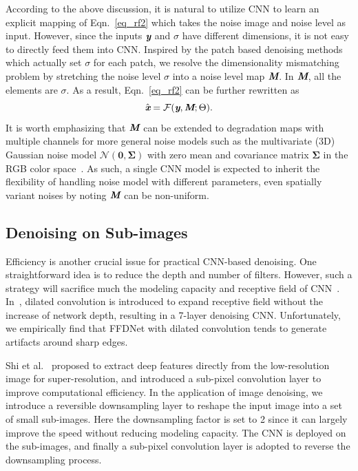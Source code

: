 \documentclass[journal]{IEEEtran}
\begin{document}
According to the above discussion, it is natural to utilize CNN to learn an explicit mapping of Eqn.~\eqref{eq_rf2} which takes the noise image and noise level as input.
However, since the inputs $\emph{\textbf{y}}$ and $\sigma$ have different dimensions, it is not easy to directly feed them into CNN.
Inspired by the patch based denoising methods which actually set $\sigma$ for each patch, we resolve the dimensionality mismatching problem by stretching the noise level $\sigma$ into a noise level map $\emph{\textbf{M}}$.
In $\emph{\textbf{M}}$, all the elements are $\sigma$. As a result, Eqn.~\eqref{eq_rf2} can be further rewritten as
\begin{equation}\label{eq_rf3}
\hat{\emph{\textbf{x}}} = \mathcal{F}(\emph{\textbf{y}}, \emph{\textbf{M}}; \Theta).
\end{equation}
It is worth emphasizing that $\emph{\textbf{M}}$ can be extended to degradation maps with multiple channels for more general noise models such as the multivariate (3D) Gaussian noise model $ \mathcal{N}(\mathbf{0},\mathbf{\Sigma})$ with zero mean and covariance matrix $\mathbf{\Sigma}$ in the RGB color space~\cite{Nam_2016_CVPR}.
As such, a single CNN model is expected to inherit the flexibility of handling noise model with different parameters, even spatially variant noises by noting $\emph{\textbf{M}}$ can be non-uniform.

\subsection{Denoising on Sub-images}

Efficiency is another crucial issue for practical CNN-based denoising. One straightforward idea is to reduce the depth and number of filters. However, such a strategy will sacrifice much the modeling capacity and receptive field of CNN~\cite{zhang2017beyond}.
In~\cite{zhang2017learning}, dilated convolution is introduced to expand receptive field without the increase of network depth, resulting in a 7-layer denoising CNN. Unfortunately, we empirically find that FFDNet with dilated convolution tends to generate artifacts around sharp edges.

Shi et al.~\cite{shi2016real} proposed to extract deep features directly from the low-resolution image for super-resolution, and introduced a sub-pixel convolution layer to improve computational efficiency. In the application of image denoising, we introduce a reversible downsampling layer to reshape the input image into a set of small sub-images. Here the downsampling factor is set to 2 since it can largely improve the speed without reducing modeling capacity. The CNN is deployed on the sub-images, and finally a sub-pixel convolution layer is adopted to reverse the downsampling process.
\end{document}
